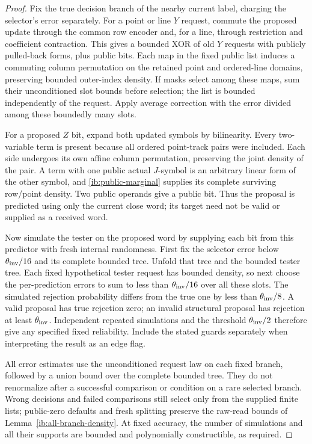\begin{proof}
Fix the true decision branch of the nearby current label, charging
the selector's error separately. For a point or line \(Y\) request,
commute the proposed update through the common row encoder and,
for a line, through restriction and coefficient contraction.
This gives a bounded XOR of old \(Y\) requests with publicly
pulled-back forms, plus public bits. Each map in the fixed public
list induces a commuting column permutation on the retained point
and ordered-line domains, preserving bounded outer-index density.
If masks select among these maps, sum their unconditioned slot
bounds before selection; the list is bounded independently of the
request. Apply average correction with the error divided among
these boundedly many slots.

For a proposed \(Z\) bit, expand both updated symbols by bilinearity.
Every two-variable term is present because all ordered point-track
pairs were included. Each side undergoes its own affine column
permutation, preserving the joint density of the pair. A term with
one public actual \(J\)-symbol is an arbitrary linear form of the
other symbol, and \eqref{ib:public-marginal} supplies its complete
surviving row/point density. Two public operands give a public bit.
Thus the proposal is predicted using only the current close word;
its target need not be valid or supplied as a received word.

Now simulate the tester on the proposed word by supplying each bit
from this predictor with fresh internal randomness. First fix the
selector error below \(\theta_{\rm inv}/16\) and its complete
bounded tree. Unfold that tree and the bounded tester tree. Each
fixed hypothetical tester request has bounded density, so next
choose the per-prediction errors to sum to less than
\(\theta_{\rm inv}/16\) over all these slots. The simulated
rejection probability differs from the true one by less than
\(\theta_{\rm inv}/8\). A valid proposal has
true rejection zero; an invalid structural proposal has rejection
at least \(\theta_{\rm inv}\). Independent repeated simulations
and the threshold \(\theta_{\rm inv}/2\) therefore give any
specified fixed reliability. Include the stated guards separately
when interpreting the result as an edge flag.

All error estimates use the unconditioned request law on each
fixed branch, followed by a union bound over the complete bounded
tree. They do not renormalize after a successful comparison or
condition on a rare selected branch. Wrong decisions and failed
comparisons still select only from the supplied finite lists;
public-zero defaults and fresh splitting preserve the raw-read
bounds of Lemma~\ref{ib:all-branch-density}. At fixed accuracy,
the number of simulations and all their supports are bounded and
polynomially constructible, as required.
\end{proof}
